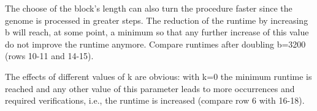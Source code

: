 \documentclass[11pt, notitlepage]{scrartcl}
\begin{document}
The choose of the block's length can also turn the procedure faster since the genome is processed in greater steps. The reduction of the runtime by increasing b will reach, at some point, a minimum so that any further increase of this value do not improve the runtime anymore. Compare runtimes after doubling b=3200 (rows 10-11 and 14-15).

The effects of different values of k are obvious: with k=0 the minimum runtime is reached and any other value of this parameter leads to more occurrences and required verifications, i.e., the runtime is increased (compare row 6 with 16-18).


\end{document}

